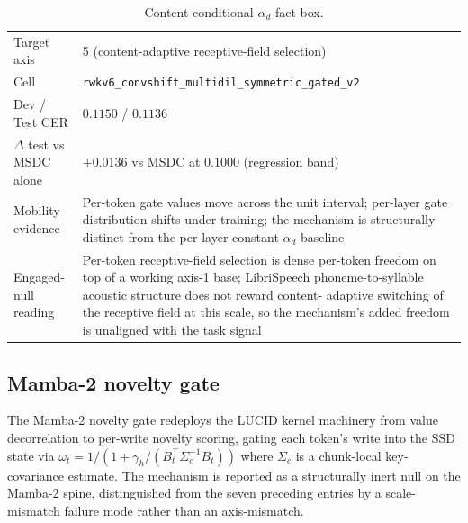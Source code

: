 \begin{table}[h]
\centering
\small
\caption[Content-conditional $\alpha_{d}$ engaged-null
entry]{Content-conditional $\alpha_{d}$ fact box.}
\label{tab:engaged-null:cb3}
\setlength{\tabcolsep}{6pt}
\renewcommand{\arraystretch}{1.05}
\begin{tabularx}{\linewidth}{@{}p{3.3cm} X@{}}
\toprule
Target axis & 5 (content-adaptive receptive-field selection) \\
Cell & \texttt{rwkv6\_convshift\_multidil\_symmetric\_gated\_v2} \\
Dev / Test CER & $0.1150$ / $0.1136$ \\
$\Delta$ test vs MSDC alone & $+0.0136$ vs MSDC at $0.1000$
(regression band) \\
Mobility evidence & Per-token gate values move across the unit
interval; per-layer gate distribution shifts under training; the
mechanism is structurally distinct from the per-layer constant
$\alpha_{d}$ baseline \\
Engaged-null reading & Per-token receptive-field selection is dense
per-token freedom on top of a working axis-1 base; LibriSpeech
phoneme-to-syllable acoustic structure does not reward content-
adaptive switching of the receptive field at this scale, so the
mechanism's added freedom is unaligned with the task signal \\
\bottomrule
\end{tabularx}
\end{table}

\subsection{Mamba-2 novelty gate}\label{app:engaged-null:novelty}

The Mamba-2 novelty gate redeploys the LUCID kernel machinery from
value decorrelation to per-write novelty scoring, gating each token's
write into the SSD state via
$\omega_{t} = 1 / (1 + \gamma_{h} / (B_{t}^{\top} \Sigma_{c}^{-1} B_{t}))$
where $\Sigma_{c}$ is a chunk-local key-covariance estimate. The
mechanism is reported as a structurally inert null on the Mamba-2
spine, distinguished from the seven preceding entries by a
scale-mismatch failure mode rather than an axis-mismatch.

